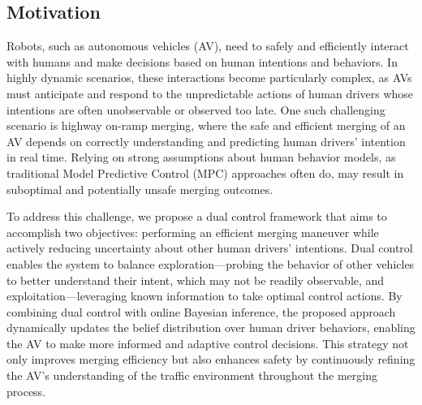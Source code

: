 \documentclass[letterpaper, 10 pt, conference]{IEEEconf}
\begin{document}
\subsection{Motivation}
Robots, such as autonomous vehicles (AV), need to safely and efficiently interact with humans and make decisions based on human intentions and behaviors. In highly dynamic scenarios, these interactions become particularly complex, as AVs must anticipate and respond to the unpredictable actions of human drivers whose intentions are often unobservable or observed too late. One such challenging scenario is highway on-ramp merging, where the safe and efficient merging of an AV depends on correctly understanding and predicting human drivers’ intention in real time. Relying on strong assumptions about human behavior models, as traditional Model Predictive Control (MPC) approaches often do, may result in suboptimal and potentially unsafe merging outcomes. 

To address this challenge, we propose a dual control framework that aims to accomplish two objectives: performing an efficient merging maneuver while actively reducing uncertainty about other human drivers' intentions. Dual control enables the system to balance exploration—probing the behavior of other vehicles to better understand their intent, which may not be readily observable, and exploitation—leveraging known information to take optimal control actions. By combining dual control with online Bayesian inference, the proposed approach dynamically updates the belief distribution over human driver behaviors, enabling the AV to make more informed and adaptive control decisions. This strategy not only improves merging efficiency but also enhances safety by continuously refining the AV's understanding of the traffic environment throughout the merging process.
\end{document}
